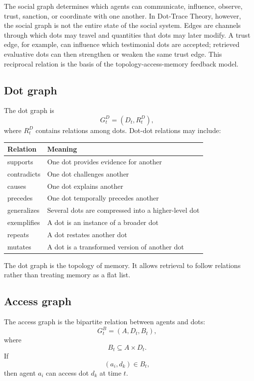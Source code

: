\documentclass[11pt]{article}
\theoremstyle{remark}
\begin{document}
The social graph determines which agents can communicate, influence, observe, trust, sanction, or coordinate with one another. In Dot-Trace Theory, however, the social graph is not the entire state of the social system. Edges are channels through which dots may travel and quantities that dots may later modify. A trust edge, for example, can influence which testimonial dots are accepted; retrieved evaluative dots can then strengthen or weaken the same trust edge. This reciprocal relation is the basis of the topology-access-memory feedback model.

\subsection{Dot graph}\label{dot-graph}

The dot graph is \[
G^D_t = (D_t,R_t^D),
\] where \(R_t^D\) contains relations among dots. Dot-dot relations may
include:

\begin{longtable}[]{@{}ll@{}}
\toprule\noalign{}
Relation & Meaning \\
\midrule\noalign{}
\endhead
\bottomrule\noalign{}
\endlastfoot
supports & One dot provides evidence for another \\
contradicts & One dot challenges another \\
causes & One dot explains another \\
precedes & One dot temporally precedes another \\
generalizes & Several dots are compressed into a higher-level dot \\
exemplifies & A dot is an instance of a broader dot \\
repeats & A dot restates another dot \\
mutates & A dot is a transformed version of another dot \\
\end{longtable}

The dot graph is the topology of memory. It allows retrieval to follow
relations rather than treating memory as a flat list.

\subsection{Access graph}\label{access-graph}

The access graph is the bipartite relation between agents and dots: \[
G^B_t = (A,D_t,B_t),
\] where \[
B_t \subseteq A \times D_t.
\] If \[
(a_i,d_k) \in B_t,
\] then agent \(a_i\) can access dot \(d_k\) at time \(t\).
\end{document}
